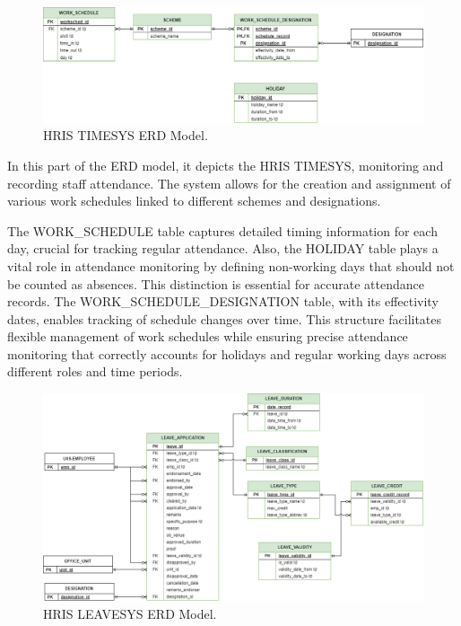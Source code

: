     \begin{figure}[H]
        \centering
        \includegraphics[width=1\linewidth]{figures/images/erd-timesys.png}
        \caption{HRIS TIMESYS ERD Model.}
        \label{fig:erd-timesys}
    \end{figure}

    In this part of the ERD model, it depicts the HRIS TIMESYS, monitoring and recording staff attendance. The system allows for the creation and assignment of various work schedules linked to different schemes and designations. 

    The WORK\_SCHEDULE table captures detailed timing information for each day, crucial for tracking regular attendance. Also, the HOLIDAY table plays a vital role in attendance monitoring by defining non-working days that should not be counted as absences. This distinction is essential for accurate attendance records. The WORK\_SCHEDULE\_DESIGNATION table, with its effectivity dates, enables tracking of schedule changes over time. This structure facilitates flexible management of work schedules while ensuring precise attendance monitoring that correctly accounts for holidays and regular working days across different roles and time periods.

    \begin{figure}[H]
        \centering
        \includegraphics[width=1\linewidth]{figures/images/erd-leavesys.png}
        \caption{HRIS LEAVESYS ERD Model.}
        \label{fig:erd-leavesys}
    \end{figure}

